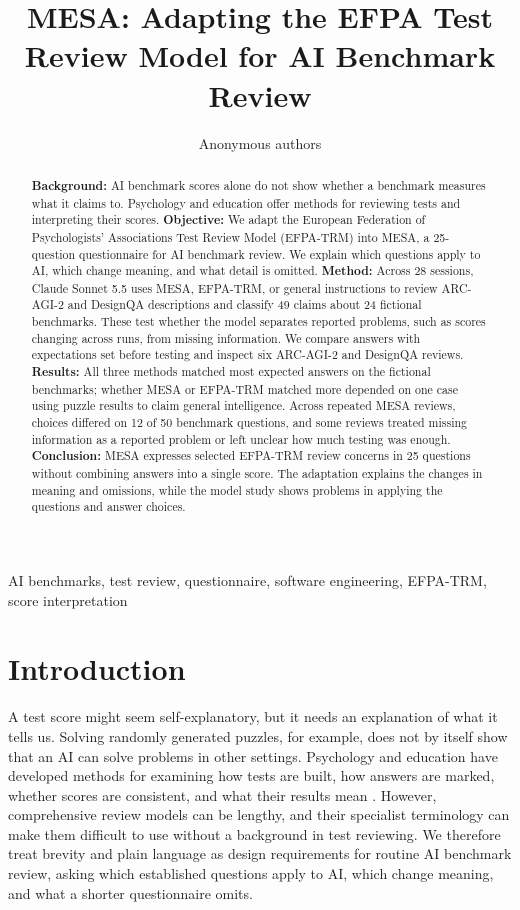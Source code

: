 \documentclass[10pt,conference]{IEEEtran}
\begin{document}
\title{MESA: Adapting the EFPA Test Review Model for AI Benchmark Review}
\author{Anonymous authors}
\maketitle
\begin{abstract}
\textbf{Background:} AI benchmark scores alone do not show whether a benchmark measures what it claims to. Psychology and education offer methods for reviewing tests and interpreting their scores.
\textbf{Objective:} We adapt the European Federation of Psychologists' Associations Test Review Model (EFPA-TRM) into MESA, a 25-question questionnaire for AI benchmark review. We explain which questions apply to AI, which change meaning, and what detail is omitted.
\textbf{Method:} Across 28 sessions, Claude Sonnet 5.5 uses MESA, EFPA-TRM, or general instructions to review ARC-AGI-2 and DesignQA descriptions and classify 49 claims about 24 fictional benchmarks. These test whether the model separates reported problems, such as scores changing across runs, from missing information. We compare answers with expectations set before testing and inspect six ARC-AGI-2 and DesignQA reviews.
\textbf{Results:} All three methods matched most expected answers on the fictional benchmarks; whether MESA or EFPA-TRM matched more depended on one case using puzzle results to claim general intelligence. Across repeated MESA reviews, choices differed on 12 of 50 benchmark questions, and some reviews treated missing information as a reported problem or left unclear how much testing was enough.
\textbf{Conclusion:} MESA expresses selected EFPA-TRM review concerns in 25 questions without combining answers into a single score. The adaptation explains the changes in meaning and omissions, while the model study shows problems in applying the questions and answer choices.
\end{abstract}
\begin{IEEEkeywords}
AI benchmarks, test review, questionnaire, software engineering, EFPA-TRM, score interpretation
\end{IEEEkeywords}

\section{Introduction}
A test score might seem self-explanatory, but it needs an explanation of what it tells us. Solving randomly generated puzzles, for example, does not by itself show that an AI can solve problems in other settings. Psychology and education have developed methods for examining how tests are built, how answers are marked, whether scores are consistent, and what their results mean \cite{aera_apa_ncme_standards_2014,kane_validation}. However, comprehensive review models can be lengthy, and their specialist terminology can make them difficult to use without a background in test reviewing. We therefore treat brevity and plain language as design requirements for routine AI benchmark review, asking which established questions apply to AI, which change meaning, and what a shorter questionnaire omits.
\end{document}
